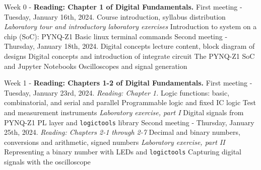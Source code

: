 \documentclass[10pt]{article}
\begin{document}
\begin{outline}[enumerate]
\1 Week 0 - \textbf{Reading: Chapter 1 of Digital Fundamentals.}
\2 First meeting - Tuesday, January 16th, 2024.
\3 Course introduction, syllabus distribution
\3 \textit{Laboratory tour and introductory laboratory exercises}
\4 Introduction to system on a chip (SoC): PYNQ-Z1
\4 Basic linux terminal commands
\2 Second meeting - Thursday, January 18th, 2024.
\3 Digital concepts lecture content, block diagram of designs
\3 Digital concepts and introduction of integrate circuit
\4 The PYNQ-Z1 SoC and Jupyter Notebooks
\4 Oscilloscopes and signal generation

\1 Week 1 - \textbf{Reading: Chapters 1-2 of Digital Fundamentals.}
\2 First meeting - Tuesday, January 23rd, 2024. \textit{Reading: Chapter 1.}
\3 Logic functions: basic, combinatorial, and serial and parallel
\3 Programmable logic and fixed IC logic
\3 Test and measurement instruments
\3 \textit{Laboratory exercise, part I}
\4 Digital signals from PYNQ-Z1
\4 PL layer and \verb+logictools+ library
\2 Second meeting - Thursday, January 25th, 2024. \textit{Reading: Chapters 2-1 through 2-7}
\3 Decimal and binary numbers, conversions and arithmetic, signed numbers
\3 \textit{Laboratory exercise, part II}
\4 Representing a binary number with LEDs and \verb+logictools+
\4 Capturing digital signals with the oscilloscope


\end{outline}
\end{document}
